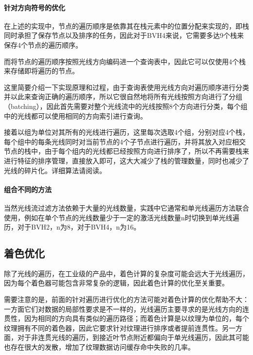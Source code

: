 \paragraph{针对方向符号的优化}
在上述\cite{a:DynamicRayStreamTraversal}的实现中，节点的遍历顺序是依靠其在栈元素中的位置分配来实现的，即栈同时承担了保存节点以及排序的任务，因此对于BVH4来说，它需要多达9个栈来保存4个节点的遍历顺序。

而\cite{a:EfficientRayTracingKernelsforModernCPUArchitectures}将节点的遍历顺序按照光线方向编码进一个查询表中，因此它可以仅使用4个栈来存储即将遍历的节点。

这里简要介绍一下实现原理和过程，由于查询表使用光线方向对遍历顺序进行分类并以此来查询正确的遍历顺序，所以它很自然地将所有光线按照方向进行了分组（batching），因此首先需要对整个光线流中的光线按照8个方向进行分类，每个组中的光线都可以使用相同的方向索引进行查询。

接着以组为单位对其所有的光线进行遍历，这里每次选取4个组，分别对应4个栈，每个组中的每条光线同时对当前节点的4个子节点进行遍历，并将其放入对应相交节点的栈中，由于每个组内的光线都已经按照方向进行排序了，所以不再需要栈来进行特征的排序管理，直接放入即可，这大大减少了栈的管理数量，同时也减少了光线的碎片化。详细算法请阅读\cite{a:EfficientRayTracingKernelsforModernCPUArchitectures}。





\paragraph{组合不同的方法}
当然光线流过滤方法依赖于大量的光线数量，实践中它通常和单光线遍历方法联合使用\cite{a:CombiningSingleandPacketRayTracingforArbitraryRayDistributionsontheIntelRMICArchitecture,a:DynamicRayStreamTraversal,a:EfficientRayTracingKernelsforModernCPUArchitectures}，例如\cite{a:DynamicRayStreamTraversal}在单个节点的光线数量少于一定的激活光线数量n时切换到单光线遍历，对于BVH2，n为8，对于BVH4，n为16。








\subsection{着色优化}\label{sec:pt-shading}
除了光线的遍历，在工业级的产品中，着色计算的复杂度可能会远大于光线遍历，因为每个着色器可能包含非常复杂的逻辑，因此着色计算的优化至关重要。

需要注意的是，前面的针对遍历进行优化的方法可能对着色计算的优化帮助不大：一方面它们对数据的局部性要求是不一样的，光线遍历主要寻求的是光线方向的连贯性，因为相同的方向具有类似的遍历路径；而着色计算是以纹理为单位的，每个纹理拥有不同的着色器，因此它要求针对纹理进行排序或者提前连贯性。另一方面，对于非连贯光线的遍历，到接近叶节点附近都偏向于单光线遍历，因此其可能也存在很大的发散，增加了纹理数据访问缓存命中失败的几率。

